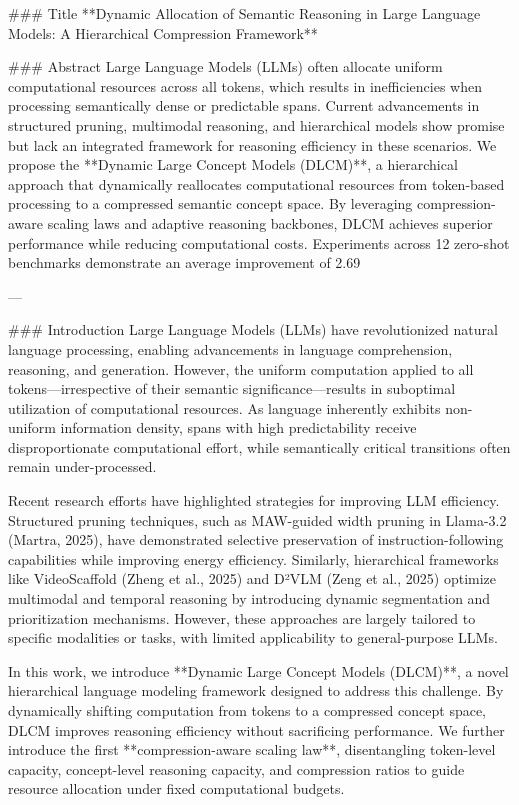 ### Title
**Dynamic Allocation of Semantic Reasoning in Large Language Models: A Hierarchical Compression Framework**

### Abstract
Large Language Models (LLMs) often allocate uniform computational resources across all tokens, which results in inefficiencies when processing semantically dense or predictable spans. Current advancements in structured pruning, multimodal reasoning, and hierarchical models show promise but lack an integrated framework for reasoning efficiency in these scenarios. We propose the **Dynamic Large Concept Models (DLCM)**, a hierarchical approach that dynamically reallocates computational resources from token-based processing to a compressed semantic concept space. By leveraging compression-aware scaling laws and adaptive reasoning backbones, DLCM achieves superior performance while reducing computational costs. Experiments across 12 zero-shot benchmarks demonstrate an average improvement of 2.69%

---

### Introduction
Large Language Models (LLMs) have revolutionized natural language processing, enabling advancements in language comprehension, reasoning, and generation. However, the uniform computation applied to all tokens—irrespective of their semantic significance—results in suboptimal utilization of computational resources. As language inherently exhibits non-uniform information density, spans with high predictability receive disproportionate computational effort, while semantically critical transitions often remain under-processed.

Recent research efforts have highlighted strategies for improving LLM efficiency. Structured pruning techniques, such as MAW-guided width pruning in Llama-3.2 (Martra, 2025), have demonstrated selective preservation of instruction-following capabilities while improving energy efficiency. Similarly, hierarchical frameworks like VideoScaffold (Zheng et al., 2025) and D²VLM (Zeng et al., 2025) optimize multimodal and temporal reasoning by introducing dynamic segmentation and prioritization mechanisms. However, these approaches are largely tailored to specific modalities or tasks, with limited applicability to general-purpose LLMs.

In this work, we introduce **Dynamic Large Concept Models (DLCM)**, a novel hierarchical language modeling framework designed to address this challenge. By dynamically shifting computation from tokens to a compressed concept space, DLCM improves reasoning efficiency without sacrificing performance. We further introduce the first **compression-aware scaling law**, disentangling token-level capacity, concept-level reasoning capacity, and compression ratios to guide resource allocation under fixed computational budgets.

